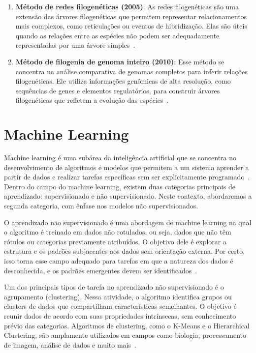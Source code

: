 \begin{enumerate}
  \item \textbf{Método de redes filogenéticas (2005)}: As redes filogenéticas são uma extensão das árvores filogenéticas que permitem representar relacionamentos mais complexos, como reticulações ou eventos de hibridização. Elas são úteis quando as relações entre as espécies não podem ser adequadamente representadas por uma árvore simples~\cite{huson_phylogenetic_networks_2006}.
  \item \textbf{Método de filogenia de genoma inteiro (2010)}: Esse método se concentra na análise comparativa de genomas completos para inferir relações filogenéticas. Ele utiliza informações genômicas de alta resolução, como sequências de genes e elementos regulatórios, para construir árvores filogenéticas que refletem a evolução das espécies~\cite{eisen_horizontal_gene_transfre_2000}.
\end{enumerate}

\section{Machine Learning}
Machine learning é uma subárea da inteligência artificial que se concentra no desenvolvimento de algoritmos e modelos que permitem a um sistema aprender a partir de dados e realizar tarefas específicas sem ser explicitamente programado~\cite{deeplearning_goodfellow_2016}. Dentro do campo do machine learning, existem duas categorias principais de aprendizado: supervisionado e não supervisionado. Neste contexto, abordaremos a segunda categoria, com ênfase nos modelos não supervisionados.

O aprendizado não supervisionado é uma abordagem de machine learning na qual o algoritmo é treinado em dados não rotulados, ou seja, dados que não têm rótulos ou categorias previamente atribuídos. O objetivo dele é explorar a estrutura e os padrões subjacentes aos dados sem orientação externa. Por certo, isso torna esse campo adequado para tarefas em que a natureza dos dados é desconhecida, e os padrões emergentes devem ser identificados~\cite{machine_learning_bishop_2006}.

Um dos principais tipos de tarefa no aprendizado não supervisionado é o agrupamento (clustering). Nessa atividade, o algoritmo identifica grupos ou clusters de dados que compartilham características semelhantes. O objetivo é reunir dados de acordo com suas propriedades intrínsecas, sem conhecimento prévio das categorias. Algoritmos de clustering, como o K-Means e o Hierarchical Clustering, são amplamente utilizados em campos como biologia, processamento de imagem, análise de dados e muito mais~\cite{machine_learning_bishop_2006}.

